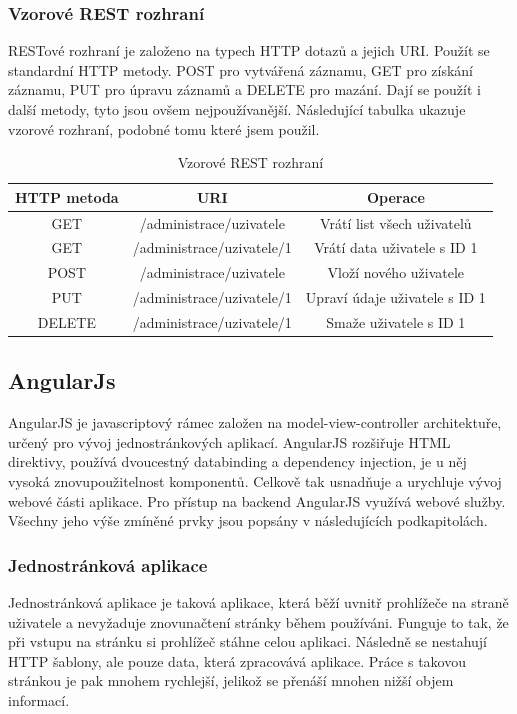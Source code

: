 \documentclass[czech,master,public,dept460,male,cpdeclaration,twoside]{diploma}
\begin{document}
\subsubsection{Vzorové REST rozhraní}
RESTové rozhraní je založeno na typech HTTP dotazů a jejich URI. Použít se standardní HTTP metody. POST pro vytvářená záznamu, GET pro získání záznamu, PUT pro úpravu záznamů a DELETE pro mazání. Dají se použít i další metody, tyto jsou ovšem nejpoužívanější. Následující tabulka ukazuje vzorové rozhraní, podobné tomu které jsem použil. \cite{RESTInterface}

\begin{table}[H]
	\centering
	\caption{Vzorové REST rozhraní}
	\label{tab:REST}
	\begin{tabular}{|c|c|c|}
		\hline
		{\bf HTTP metoda} & {\bf URI} & {\bf Operace} \\
		\hline
		GET & /administrace/uzivatele & Vrátí list všech uživatelů \\
		\hline
		GET & /administrace/uzivatele/1 & Vrátí data uživatele s ID 1 \\
		\hline
		POST & /administrace/uzivatele & Vloží nového uživatele \\
		\hline
		PUT & /administrace/uzivatele/1 & Upraví údaje uživatele s ID 1 \\
		\hline
		DELETE & /administrace/uzivatele/1 & Smaže uživatele s ID 1 \\
		\hline
	\end{tabular}
\end{table}
	
\subsection{AngularJs}
AngularJS je javascriptový rámec založen na model-view-controller architektuře, určený pro vývoj jednostránkových aplikací. AngularJS rozšiřuje HTML direktivy, používá dvoucestný databinding a dependency injection, je u něj vysoká znovupoužitelnost komponentů. Celkově tak usnadňuje a urychluje vývoj webové části aplikace. Pro přístup na backend AngularJS využívá webové služby. Všechny jeho výše zmíněné prvky jsou popsány v následujících podkapitolách. \cite{coJeAngular}

\subsubsection{Jednostránková aplikace}
Jednostránková aplikace je taková aplikace, která běží uvnitř prohlížeče na straně uživatele a nevyžaduje znovunačtení stránky během používáni. Funguje to tak, že při vstupu na stránku si prohlížeč stáhne celou aplikaci. Následně se nestahují HTTP šablony, ale pouze data, která zpracovává aplikace. Práce s takovou stránkou je pak mnohem rychlejší, jelikož se přenáší mnohen nižší objem informací. \cite{SPA}
\end{document}
